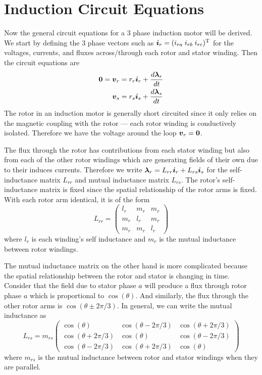 \documentclass[onecolumn]{gwclass}
\begin{document}
	
	\section{Induction Circuit Equations}
	Now the general circuit equations for a 3 phase induction motor will be derived. We start by defining the 3 phase vectors such as $\boldsymbol{i}_r=( i_{ra}\; i_{rb}\;i_{rc})^{\text{\normalfont{T}}}$ for the voltages, currents, and fluxes across/through each rotor and stator winding. Then the circuit equations are
	\begin{align*}
		\boldsymbol{0}=\boldsymbol{v}_r&= r_r\boldsymbol{i}_r + \frac{d\boldsymbol{\lambda}_r}{dt} \\
		\boldsymbol{v}_s &= r_s\boldsymbol{i}_s + \frac{d\boldsymbol{\lambda}_s}{dt}
	\end{align*}
	The rotor in an induction motor is generally short circuited since it only relies on the magnetic coupling with the rotor --- each rotor winding is conductively isolated. Therefore we have the voltage around the loop $\boldsymbol{v}_r=\boldsymbol{0}$.
	
	The flux through the rotor has contributions from each stator winding but also from each of the other rotor windings which are generating fields of their own due to their induces currents. Therefore we write $\boldsymbol{\lambda}_r = L_{rr}\boldsymbol{i}_r + L_{rs}\boldsymbol{i}_s$ for the self-inductance matrix $L_{rr}$ and mutual inductance matrix $L_{rs}$. The rotor's self-inductance matrix is fixed since the spatial relationship of the rotor arms is fixed. With each rotor arm identical, it is of the form
	$$ L_{rr} = \begin{pmatrix}
		l_r & m_r & m_r \\
		m_r & l_r & m_r \\
		m_r & m_r & l_r
	\end{pmatrix} $$
	where $l_r$ is each winding's self inductance and $m_r$ is the mutual inductance between rotor windings. 
	
	The mutual inductance matrix on the other hand is more complicated because the spatial relationship between the rotor and stator is changing in time. Consider that the field due to stator phase $a$ will produce a flux through rotor phase $a$ which is proportional to $\cos(\theta)$. And similarly, the flux through the other rotor arms is $\cos(\theta\pm 2\pi/3)$. In general, we can write the mutual inductance as
	$$  L_{rs} = m_{rs}\begin{pmatrix}
		\cos(\theta) & \cos(\theta - 2\pi/3) & \cos(\theta+2\pi/3) \\
		\cos(\theta + 2\pi/3) & \cos(\theta) & \cos(\theta - 2\pi/3) \\
		\cos(\theta - 2\pi/3) & \cos(\theta + 2\pi/3) & \cos(\theta)
	\end{pmatrix} $$
	where $m_{rs}$ is the mutual inductance between rotor and stator windings when they are parallel.
	
\end{document}
